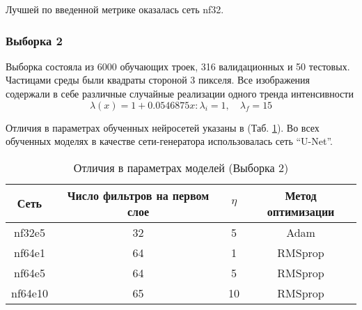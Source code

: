 			Лучшей по введенной метрике оказалась сеть nf32.
		\subsubsection{Выборка 2}
			Выборка состояла из 6000 обучающих троек, 316 валидационных и 50 тестовых. Частицами среды были квадраты стороной 3 пикселя. Все изображения содержали в себе различные случайные реализации одного тренда интенсивности
			$$\lambda(x) = 1 + 0.0546875x: \lambda_i = 1, \quad \lambda_f = 15$$
			
			Отличия в параметрах обученных нейросетей указаны в (Таб. \ref{8-sand-trend8-nns}). Во всех обученных моделях в качестве сети-генератора использовалась сеть ``U-Net''.
			
			\begin{table}[h!]
				\begin{center}
					\begin{tabular}{|c|c|c|c|}
						\hline
						Сеть & Число фильтров на первом слое & $\eta$ & Метод оптимизации\\
						\hline
						nf32e5 & 32 & 5 & Adam \\
						\hline
						nf64e1 & 64 & 1 & RMSprop \\
						\hline
						nf64e5 & 64 & 5 & RMSprop \\
						\hline
						nf64e10 & 65 & 10 & RMSprop \\
						\hline
					\end{tabular}
					\caption{Отличия в параметрах моделей (Выборка 2)}
					\label{8-sand-trend8-nns}
				\end{center}
			\end{table}
			
